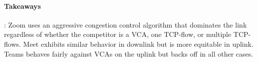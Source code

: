 
\begin{mdframed}[roundcorner=5pt, backgroundcolor=black!10]
\paragraph{Takeaways}: Zoom uses an aggressive congestion control algorithm that dominates the link regardless of whether the competitor is a VCA, one TCP-flow, or multiple TCP-flows. Meet exhibits similar behavior in downlink but is more equitable in uplink. Teams behaves fairly against VCAs on the uplink but backs off in all other cases. 
\end{mdframed}

